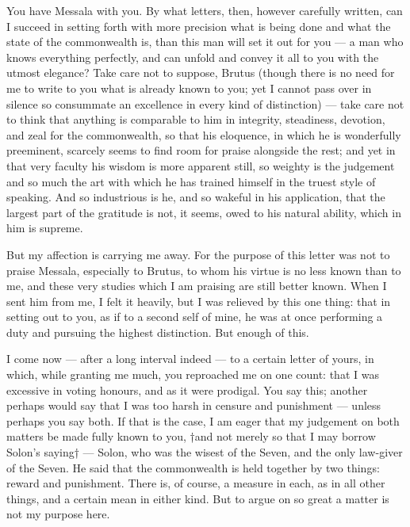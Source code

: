 

 You have Messala with you. By what letters, then, however carefully written, can I succeed in setting forth with more precision what is being done and what the state of the commonwealth is, than this man will set it out for you --- a man who knows everything perfectly, and can unfold and convey it all to you with the utmost elegance? Take care not to suppose, Brutus (though there is no need for me to write to you what is already known to you; yet I cannot pass over in silence so consummate an excellence in every kind of distinction) --- take care not to think that anything is comparable to him in integrity, steadiness, devotion, and zeal for the commonwealth, so that his eloquence, in which he is wonderfully preeminent, scarcely seems to find room for praise alongside the rest; and yet in that very faculty his wisdom is more apparent still, so weighty is the judgement and so much the art with which he has trained himself in the truest style of speaking. And so industrious is he, and so wakeful in his application, that the largest part of the gratitude is not, it seems, owed to his natural ability, which in him is supreme.

 But my affection is carrying me away. For the purpose of this letter was not to praise Messala, especially to Brutus, to whom his virtue is no less known than to me, and these very studies which I am praising are still better known. When I sent him from me, I felt it heavily, but I was relieved by this one thing: that in setting out to you, as if to a second self of mine, he was at once performing a duty and pursuing the highest distinction. But enough of this.

 I come now --- after a long interval indeed --- to a certain letter of yours, in which, while granting me much, you reproached me on one count: that I was excessive in voting honours, and as it were prodigal. You say this; another perhaps would say that I was too harsh in censure and punishment --- unless perhaps you say both. If that is the case, I am eager that my judgement on both matters be made fully known to you, †and not merely so that I may borrow Solon's saying† --- Solon, who was the wisest of the Seven, and the only law-giver of the Seven. He said that the commonwealth is held together by two things: reward and punishment. There is, of course, a measure in each, as in all other things, and a certain mean in either kind. But to argue on so great a matter is not my purpose here.

